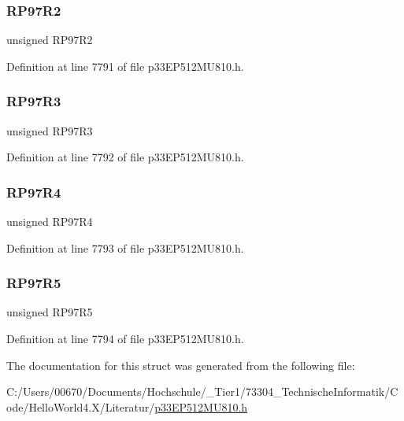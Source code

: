 \subsubsection{\texorpdfstring{R\+P97\+R2}{RP97R2}}
{\footnotesize\ttfamily unsigned R\+P97\+R2}



Definition at line 7791 of file p33\+E\+P512\+M\+U810.\+h.

\mbox{\label{structtag_r_p_o_r7_b_i_t_s_a8f6ebbe4aba2a7f31f4202464ddb5a27}} 
\subsubsection{\texorpdfstring{R\+P97\+R3}{RP97R3}}
{\footnotesize\ttfamily unsigned R\+P97\+R3}



Definition at line 7792 of file p33\+E\+P512\+M\+U810.\+h.

\mbox{\label{structtag_r_p_o_r7_b_i_t_s_ab2370f7309952ecaab9739b29663df8f}} 
\subsubsection{\texorpdfstring{R\+P97\+R4}{RP97R4}}
{\footnotesize\ttfamily unsigned R\+P97\+R4}



Definition at line 7793 of file p33\+E\+P512\+M\+U810.\+h.

\mbox{\label{structtag_r_p_o_r7_b_i_t_s_a45734e24cc1b2198c36c7aa1b3fc2188}} 
\subsubsection{\texorpdfstring{R\+P97\+R5}{RP97R5}}
{\footnotesize\ttfamily unsigned R\+P97\+R5}



Definition at line 7794 of file p33\+E\+P512\+M\+U810.\+h.



The documentation for this struct was generated from the following file\+:\begin{DoxyCompactItemize}
\item 
C\+:/\+Users/00670/\+Documents/\+Hochschule/\+\_\+\+Tier1/73304\+\_\+\+Technische\+Informatik/\+Code/\+Hello\+World4.\+X/\+Literatur/\hyperlink{p33_e_p512_m_u810_8h}{p33\+E\+P512\+M\+U810.\+h}\end{DoxyCompactItemize}
